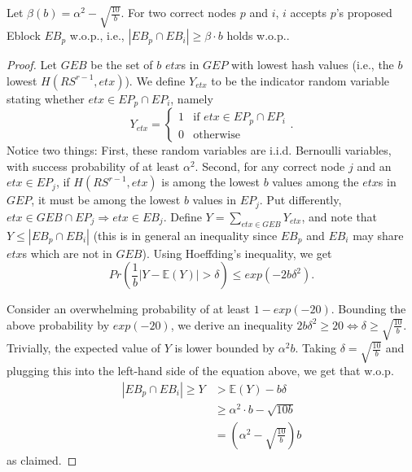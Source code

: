 \begin{claim}  Let $\beta(b) = \alpha^2 - \sqrt{\frac{10}{b}}$. For two correct nodes $p$ and $i$, $i$ accepts $p$'s proposed Eblock $EB_p$ w.o.p., i.e., $|EB_p\cap EB_i|\geq \beta \cdot b$ holds w.o.p.. 
\end{claim}




\begin{proof}
Let $GEB$ be the set of $b$ $etx$s in $GEP$ with lowest hash values (i.e., the $b$ lowest $H(RS^{r-1},etx)$). We define $Y_{etx}$ to be the indicator random variable stating whether $etx\in EP_p\cap EP_i$, namely 
\begin{equation}
    		Y_{etx} =	
		    \begin{cases}
    			  1  &\mbox{if }  etx\in EP_p\cap EP_i \\
     			  0  &\mbox{otherwise}
		     \end{cases}.
  	\end{equation} 
Notice two things: First, these random variables are i.i.d. Bernoulli variables, with success probability of at least $\alpha^2$. Second, for any correct node $j$ and an $etx \in EP_j$, if $H(RS^{r-1},etx)$ is among the lowest $b$ values among the $etx$s in $GEP$, it must be among the lowest $b$ values in $EP_j$. Put differently, $etx\in GEB\cap EP_j \Rightarrow etx\in EB_j$. Define $Y=\sum_{etx\in GEB} Y_{etx}$, and note that $Y\leq |EB_p\cap EB_i|$ (this is in general an inequality since $EB_p$ and $EB_i$ may share $etx$s which are not in $GEB$). Using Hoeffding's inequality, we get
$$Pr \left( \frac{1}{b}|Y-\mathbb{E}(Y)| >\delta \right) \leq exp(-2b\delta^2).$$

Consider an overwhelming probability of at least $1-exp(-20)$. 
Bounding the above probability by $exp(-20)$, we derive an inequality $2b\delta^2 \ge 20\iff \delta \ge \sqrt{\frac{10}{b}}$. 
Trivially, the expected value of $Y$ is lower bounded by $\alpha^2 b$. 
Taking $\delta=\sqrt{\frac{10}{b}}$ and plugging this into the left-hand side of the equation above, we get that w.o.p.  
\begin{equation}\begin{split}|EB_p\cap EB_i|\geq Y&>\mathbb{E}(Y)-b\delta\\ &\ge \alpha^2\cdot b -\sqrt{10b}\\
&=\left( \alpha^2-\sqrt{\frac{10}{b}} \right) b\end{split}\end{equation}
as claimed.
\end{proof}

